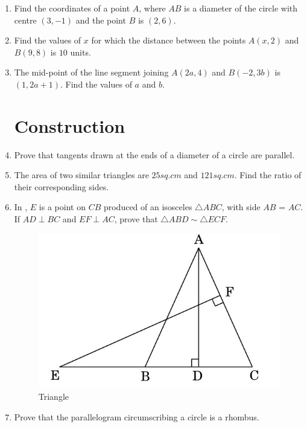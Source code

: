 \documentclass[2pt,-letter paper]{article}
\providecommand{\brak}[1]{\ensuremath{\left(#1\right)}}
\begin{document}
\begin{enumerate}
\item Find the coordinates of a point $A$, where $AB$ is a diameter of the circle with centre $\brak{3, -1}$ and the point $B$ is $\brak{2, 6}$.

\item Find the values of $x$ for which the distance between the points $A\brak{x, 2}$ and $B\brak{9, 8}$ is $10$ units.

\item The mid-point of the line segment joining $A\brak{2a, 4}$ and $B\brak{-2, 3b}$ is $\brak{1, 2a + 1}$. Find the values of $a$ and $b$.

\section{Construction}

\item Prove that tangents drawn at the ends of a diameter of a circle are parallel.

\item The area of two similar triangles are $25 sq. cm$ and $121 sq. cm$. Find the
ratio of their corresponding sides.

\item In , $E$ is a point on $CB$ produced of an isosceles ${\triangle ABC}$, with side $AB$ = $AC$. If ${AD \perp  BC }$ and ${ EF \perp AC}$, prove that ${\triangle ABD{ \sim }\triangle ECF}$.
 \begin{figure}[H]
    \centering
    \includegraphics[width=\columnwidth]{figures/Figure_1.png}
    \caption{Triangle}
    \label{fig:Fig-1}
\end{figure}

\item Prove that the parallelogram circumscribing a circle is a rhombus.


\end{enumerate}
\end{document}
